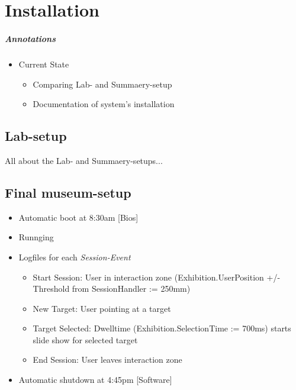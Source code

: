 \chapter{Installation}
\label{installation}

\paragraph{Annotations}

\begin{itemize}
	\item Current State
	\begin{itemize}
		\item Comparing Lab- and Summaery-setup
		\item Documentation of system's installation
	\end{itemize}
\end{itemize}



\section{Lab-setup}

All about the Lab- and Summaery-setups...



\section{Final museum-setup}

\begin{itemize}
	\item Automatic boot at 8:30am [Bios]
	\item Runnging
	\item Logfiles for each \textit{Session-Event}
	\begin{itemize}
		\item Start Session: User in interaction zone (Exhibition.UserPosition +/- Threshold from SessionHandler := 250mm)
		\item New Target: User pointing at a target
		\item Target Selected: Dwelltime (Exhibition.SelectionTime := 700ms) starts slide show for selected target
		\item End Session: User leaves interaction zone
	\end{itemize}
	\item Automatic shutdown at 4:45pm [Software]
\end{itemize}